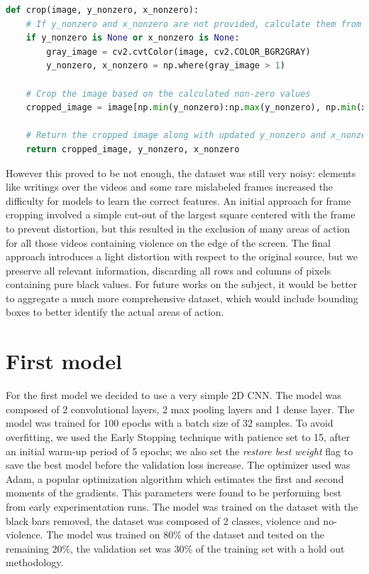 \begin{lstlisting}[language=Python, caption={Image Cropper}, label={lst:ImageCropper}]
def crop(image, y_nonzero, x_nonzero):
    # If y_nonzero and x_nonzero are not provided, calculate them from the grayscale version of the image
    if y_nonzero is None or x_nonzero is None:
        gray_image = cv2.cvtColor(image, cv2.COLOR_BGR2GRAY)
        y_nonzero, x_nonzero = np.where(gray_image > 1)

    # Crop the image based on the calculated non-zero values
    cropped_image = image[np.min(y_nonzero):np.max(y_nonzero), np.min(x_nonzero):np.max(x_nonzero)]

    # Return the cropped image along with updated y_nonzero and x_nonzero values
    return cropped_image, y_nonzero, x_nonzero
\end{lstlisting}

However this proved to be not enough, the dataset was still very noisy: elements like writings over the videos and some rare mislabeled frames increased the difficulty for models to learn the correct features. An initial approach for frame cropping involved a simple cut-out of the largest square centered with the frame to prevent distortion, but this resulted in the exclusion of many areas of action for all those videos containing violence on the edge of the screen. The final approach introduces a light distortion with respect to the original source, but we preserve all relevant information, discarding all rows and columns of pixels containing pure black values. For future works on the subject, it would be better to aggregate a much more comprehensive dataset, which would include bounding boxes to better identify the actual areas of action.

\section{First model}
For the first model we decided to use a very simple 2D CNN. The model was composed of 2 convolutional layers, 2 max pooling layers and 1 dense layer. The model was trained for 100 epochs with a batch size of 32 samples. To avoid overfitting, we used the Early Stopping technique with patience set to 15, after an initial warm-up period of 5 epochs; we also set the \textit{restore best weight} flag to save the best model before the validation loss increase. The optimizer used was Adam, a popular optimization algorithm which estimates the first and second moments of the gradients. This parameters were found to be performing best from early experimentation runs. The model was trained on the dataset with the black bars removed, the dataset was composed of 2 classes, violence and no-violence. The model was trained on 80\% of the dataset and tested on the remaining 20\%, the validation set was 30\% of the training set with a hold out methodology.  

